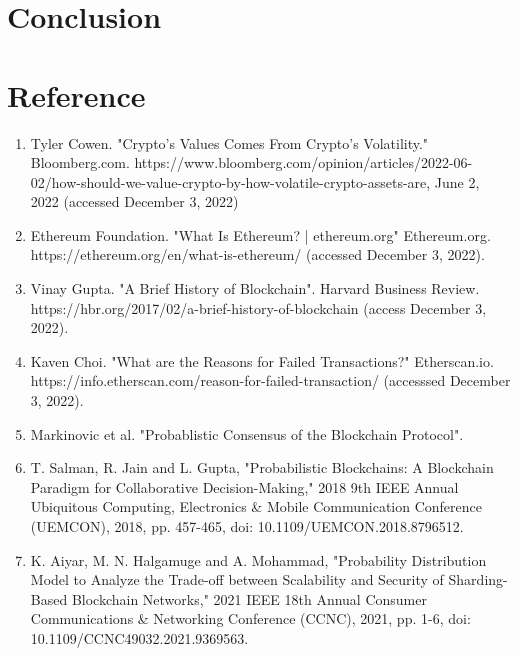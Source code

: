 \documentclass[12pt]{article}
\begin{document}
\section{Conclusion}



\pagebreak
\section{Reference}
\begin{enumerate}
	\item Tyler Cowen. "Crypto's Values Comes From Crypto's Volatility." Bloomberg.com. https://www.bloomberg.com/opinion/articles/2022-06-02/how-should-we-value-crypto-by-how-volatile-crypto-assets-are, June 2, 2022 (accessed December 3, 2022)
	\item Ethereum Foundation. "What Is Ethereum? | ethereum.org" Ethereum.org. \\https://ethereum.org/en/what-is-ethereum/ (accessed December 3, 2022).
	\item Vinay Gupta. "A Brief History of Blockchain". Harvard Business Review. \\ https://hbr.org/2017/02/a-brief-history-of-blockchain (access December 3, 2022).
	\item Kaven Choi. "What are the Reasons for Failed Transactions?" Etherscan.io.\\ https://info.etherscan.com/reason-for-failed-transaction/ (accesssed December 3, 2022).
	\item Markinovic et al. "Probablistic Consensus of the Blockchain Protocol". \\ %
	\item T. Salman, R. Jain and L. Gupta, "Probabilistic Blockchains: A Blockchain Paradigm for Collaborative Decision-Making," 2018 9th IEEE Annual Ubiquitous Computing, Electronics \& Mobile Communication Conference (UEMCON), 2018, pp. 457-465, doi: 10.1109/UEMCON.2018.8796512.
	\item K. Aiyar, M. N. Halgamuge and A. Mohammad, "Probability Distribution Model to Analyze the Trade-off between Scalability and Security of Sharding-Based Blockchain Networks," 2021 IEEE 18th Annual Consumer Communications \& Networking Conference (CCNC), 2021, pp. 1-6, doi: 10.1109/CCNC49032.2021.9369563.

\end{enumerate}
\end{document}
